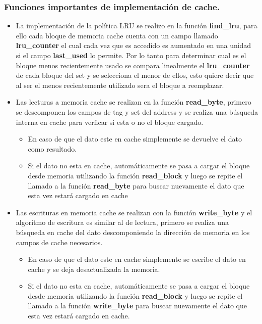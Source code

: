 \documentclass[titlepage,a4paper]{article}
\begin{document}
    \subsubsection{Funciones importantes de implementación de cache.}
    \begin{itemize}
        \item La implementación de la política LRU se realizo en la función \textbf{find\_lru}, para ello cada bloque de memoria cache cuenta con un campo llamado \textbf{lru\_counter} el cual cada vez que es accedido es aumentado en una unidad si el campo \textbf{last\_used} lo permite. Por lo tanto para determinar cual es el bloque menos recientemente usado se compara linealmente el \textbf{lru\_counter} de cada bloque del set y se selecciona el menor de ellos, esto quiere decir que al ser el menos recientemente utilizado sera el bloque a reemplazar.
        \item Las lecturas a memoria cache se realizan en la función \textbf{read\_byte}, primero se descomponen los campos de tag y set del address y se realiza una búsqueda interna en cache para verficar si esta o no el bloque cargado. 
        \begin{itemize}
            \item En caso de que el dato este en cache simplemente se devuelve el dato como resultado.
            \item Si el dato no esta en cache, automáticamente se pasa a cargar el bloque desde memoria utilizando la función \textbf{read\_block} y luego se repite el llamado a la función \textbf{read\_byte} para buscar nuevamente el dato que esta vez estará cargado en cache
        \end{itemize}
        \item Las escrituras en memoria cache se realizan con la función \textbf{write\_byte} y el algoritmo de escritura es similar al de lectura, primero se realiza una búsqueda en cache del dato descomponiendo la dirección de memoria en los campos de cache necesarios.
            \begin{itemize}
                \item En caso de que el dato este en cache simplemente se escribe el dato en cache y se deja desactualizada la memoria.
                \item Si el dato no esta en cache, automáticamente se pasa a cargar el bloque desde memoria utilizando la función \textbf{read\_block} y luego se repite el llamado a la función \textbf{write\_byte} para buscar nuevamente el dato que esta vez estará cargado en cache.

\end{itemize}
\end{itemize}
\end{document}
